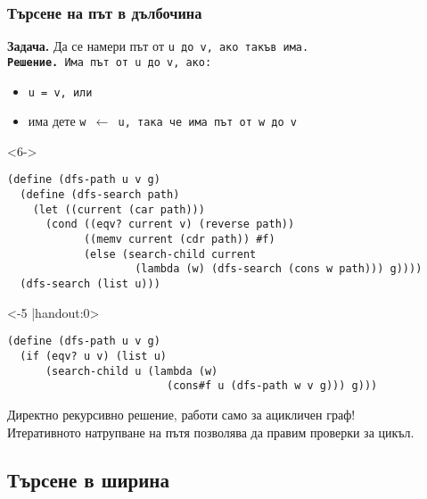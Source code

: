 \documentclass[alsotrans]{beamerswitch}
\begin{document}
\begin{frame}[fragile]
  \frametitle{Търсене на път в дълбочина}

  \textbf{Задача.} Да се намери път от \tt u до \tt v, ако такъв има.\\
  \pause\onslide<+->
  \textbf{Решение.} Има път от \tt u до \tt v, ако:
  \begin{itemize}
  \item \tt u = \tt v, или
  \item има дете \tt w $\leftarrow$ \tt u, така че има път от \tt w до \tt v
  \end{itemize}
  \vspace{-2ex}
  \onslide<+-> \small
    \begin{overlayarea}{\textwidth}{26.5ex}
      \begin{onlyenv}<6->
\begin{lstlisting}
(define (dfs-path u v g)
  (define (dfs-search path)
    (let ((current (car path)))
      (cond ((eqv? current v) (reverse path))
            ((memv current (cdr path)) #f)
            (else (search-child current
                    (lambda (w) (dfs-search (cons w path))) g))))
  (dfs-search (list u)))
\end{lstlisting}
      \end{onlyenv}
      \begin{onlyenv}<-5 |handout:0>
\begin{lstlisting}
(define (dfs-path u v g)
  (if (eqv? u v) (list u)
      (search-child u (lambda (w)
                         (cons#f u (dfs-path w v g))) g)))
\end{lstlisting}
      \end{onlyenv}
    \end{overlayarea}
    \onslide<+->
    \alert{Директно рекурсивно решение, работи само за ацикличен граф!}\\
    \onslide<+->
    Итеративното натрупване на пътя позволява да правим проверки за цикъл.
\end{frame}

\subsection{Търсене в ширина}
\end{document}
